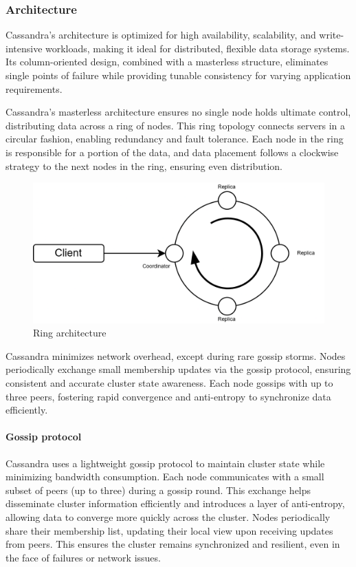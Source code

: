 \subsubsection{Architecture}
Cassandra's architecture is optimized for high availability, scalability, and write-intensive workloads, making it ideal for distributed, flexible data storage systems. 
Its column-oriented design, combined with a masterless structure, eliminates single points of failure while providing tunable consistency for varying application requirements.

Cassandra's masterless architecture ensures no single node holds ultimate control, distributing data across a ring of nodes. 
This ring topology connects servers in a circular fashion, enabling redundancy and fault tolerance.
Each node in the ring is responsible for a portion of the data, and data placement follows a clockwise strategy to the next nodes in the ring, ensuring even distribution.
\begin{figure}[H]
    \centering
    \includegraphics[width=0.65\linewidth]{images/ring.png}
    \caption{Ring architecture}
\end{figure}

Cassandra minimizes network overhead, except during rare gossip storms. 
Nodes periodically exchange small membership updates via the gossip protocol, ensuring consistent and accurate cluster state awareness.
Each node gossips with up to three peers, fostering rapid convergence and anti-entropy to synchronize data efficiently.

\paragraph*{Gossip protocol}
Cassandra uses a lightweight gossip protocol to maintain cluster state while minimizing bandwidth consumption. 
Each node communicates with a small subset of peers (up to three) during a gossip round. 
This exchange helps disseminate cluster information efficiently and introduces a layer of anti-entropy, allowing data to converge more quickly across the cluster. 
Nodes periodically share their membership list, updating their local view upon receiving updates from peers. 
This ensures the cluster remains synchronized and resilient, even in the face of failures or network issues.

